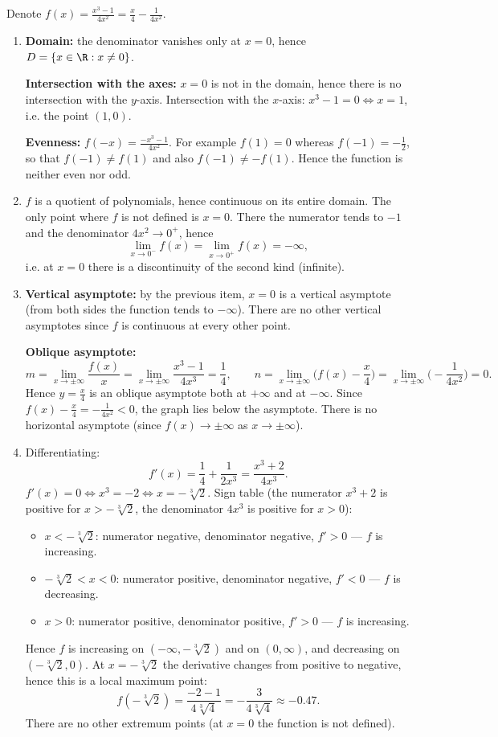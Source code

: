 \begin{solution}
Denote $f(x)=\frac{x^3-1}{4x^2}=\frac{x}{4}-\frac{1}{4x^2}$.
\begin{enumerate}
  \item \textbf{Domain:} the denominator vanishes only at $x=0$, hence $D=\{x\in\R : x\neq 0\}$.

  \textbf{Intersection with the axes:} $x=0$ is not in the domain, hence there is no intersection with the $y$-axis. Intersection with the $x$-axis: $x^3-1=0 \iff x=1$, i.e. the point $(1,0)$.

  \textbf{Evenness:} $f(-x)=\frac{-x^3-1}{4x^2}$. For example $f(1)=0$ whereas $f(-1)=-\frac12$, so that $f(-1)\neq f(1)$ and also $f(-1)\neq -f(1)$. Hence the function is neither even nor odd.

  \item $f$ is a quotient of polynomials, hence continuous on its entire domain. The only point where $f$ is not defined is $x=0$. There the numerator tends to $-1$ and the denominator $4x^2\to 0^+$, hence
  \[ \lim_{x\to 0^-} f(x)=\lim_{x\to 0^+} f(x)=-\infty , \]
  i.e. at $x=0$ there is a discontinuity of the second kind (infinite).

  \item \textbf{Vertical asymptote:} by the previous item, $x=0$ is a vertical asymptote (from both sides the function tends to $-\infty$). There are no other vertical asymptotes since $f$ is continuous at every other point.

  \textbf{Oblique asymptote:}
  \[ m=\lim_{x\to\pm\infty}\frac{f(x)}{x}=\lim_{x\to\pm\infty}\frac{x^3-1}{4x^3}=\frac14,\qquad
     n=\lim_{x\to\pm\infty}\Big(f(x)-\frac{x}{4}\Big)=\lim_{x\to\pm\infty}\Big(-\frac{1}{4x^2}\Big)=0 . \]
  Hence $y=\frac{x}{4}$ is an oblique asymptote both at $+\infty$ and at $-\infty$. Since $f(x)-\frac{x}{4}=-\frac{1}{4x^2}<0$, the graph lies below the asymptote. There is no horizontal asymptote (since $f(x)\to\pm\infty$ as $x\to\pm\infty$).

  \item Differentiating:
  \[ f'(x)=\frac14+\frac{1}{2x^3}=\frac{x^3+2}{4x^3}. \]
  $f'(x)=0 \iff x^3=-2 \iff x=-\sqrt[3]{2}$. Sign table (the numerator $x^3+2$ is positive for $x>-\sqrt[3]{2}$, the denominator $4x^3$ is positive for $x>0$):
  \begin{itemize}
    \item $x<-\sqrt[3]{2}$: numerator negative, denominator negative, $f'>0$ --- $f$ is increasing.
    \item $-\sqrt[3]{2}<x<0$: numerator positive, denominator negative, $f'<0$ --- $f$ is decreasing.
    \item $x>0$: numerator positive, denominator positive, $f'>0$ --- $f$ is increasing.
  \end{itemize}
  Hence $f$ is increasing on $(-\infty,-\sqrt[3]{2})$ and on $(0,\infty)$, and decreasing on $(-\sqrt[3]{2},0)$.
  At $x=-\sqrt[3]{2}$ the derivative changes from positive to negative, hence this is a local maximum point:
  \[ f(-\sqrt[3]{2})=\frac{-2-1}{4\sqrt[3]{4}}=-\frac{3}{4\sqrt[3]{4}}\approx -0.47 . \]
  There are no other extremum points (at $x=0$ the function is not defined).


\end{enumerate}
\end{solution}

